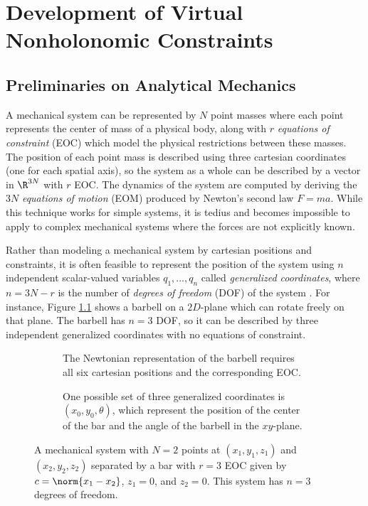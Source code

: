 

\chapter{Development of Virtual Nonholonomic Constraints}

\section{Preliminaries on Analytical Mechanics}
A mechanical system can be represented by \(N\) point masses where each point
represents the center of mass of a physical body, along with \(r\)
\textit{equations of constraint} (EOC) which model the physical restrictions
between these masses.
The position of each point mass is described using three cartesian coordinates (one
for each spatial axis), so the system as a whole can be described by a vector in
\(\R^{3N}\) with \(r\) EOC. 
The dynamics of the system are computed by deriving the \(3N\)
\textit{equations of motion} (EOM) produced by Newton's second law \(F = m a\).
While this technique works for simple systems, it is tedius and becomes
impossible to apply to complex mechanical systems where the forces are not
explicitly known. 

Rather than modeling a mechanical system by cartesian positions and constraints,
it is often feasible to represent the position of the system using \(n\)
independent scalar-valued variables \(q_1,\ldots,q_n\) called 
\textit{generalized coordinates}, where \(n = 3N - r\) is the number of
\textit{degrees of freedom} (DOF) of the system \cite{greenwood_dynamics}. For
instance, Figure \ref{fig:barbell} shows a barbell on a \(2D\)-plane which can
rotate freely on that plane. 
The barbell has \(n = 3\) DOF, so it can be described by three
independent generalized coordinates with no equations of constraint.

\begin{figure}
   \centering
   \begin{subfigure}[]{0.75\textwidth}
      
      \caption{The Newtonian representation of the barbell 
      requires all six cartesian positions and the corresponding EOC.}
   \end{subfigure}
   \begin{subfigure}[]{0.75\textwidth}
      
      \caption{One possible set of three generalized coordinates is
       \((x_0,y_0,\theta)\), which represent the position of the 
       center of the bar and the angle of the barbell in the \(xy\)-plane.}
   \end{subfigure}
   \caption{A mechanical system with \(N = 2\) points at \((x_1,y_1,z_1)\)
   and \((x_2,y_2,z_2)\) separated by a bar with \(r = 3\) EOC given by 
   \(c = \norm{x_1 - x_2}\), \(z_1 = 0\), and \(z_2 = 0\). This system has \(n =
   3\) degrees of freedom.}
   \label{fig:barbell}
\end{figure}

